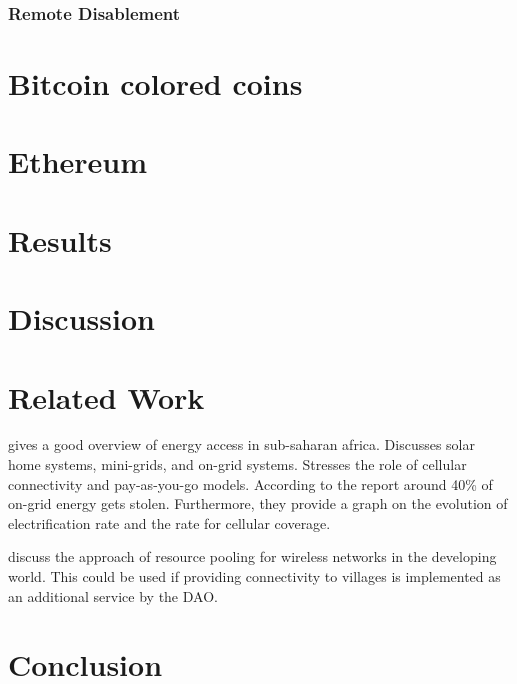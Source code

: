 \subsubsection{Remote Disablement}
\section{Bitcoin colored coins}

\section{Ethereum}

\section{Results}

\section{Discussion}

\section{Related Work}

\cite{gsma2014} gives a good overview of energy access in sub-saharan africa. Discusses solar home systems, mini-grids, and on-grid systems. Stresses the role of cellular connectivity and pay-as-you-go models. According to the report around 40\% of on-grid energy gets stolen. Furthermore, they provide a graph on the evolution of electrification rate and the rate for cellular coverage.

\cite{DBLP:journals/corr/QadirSWC16} discuss the approach of resource pooling for wireless networks in the developing world. This could be used if providing connectivity to villages is implemented as an additional service by the DAO.

\section{Conclusion}


